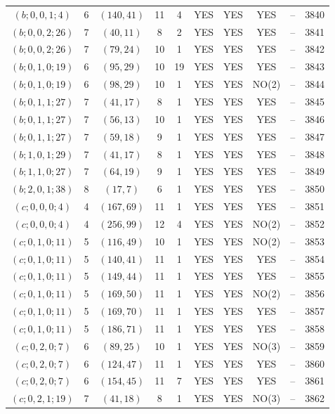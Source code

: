 \begin{longtable}{|c|c|c|c|c|c|c|c|c|c|}
$(b; 0, 0, 1; 4)$ & 6 & $(140, 41)$ & 11 & 4 & YES & YES & YES & -- & 3840\\
$(b; 0, 0, 2; 26)$ & 7 & $(40, 11)$ & 8 & 2 & YES & YES & YES & -- & 3841\\
$(b; 0, 0, 2; 26)$ & 7 & $(79, 24)$ & 10 & 1 & YES & YES & YES & -- & 3842\\
$(b; 0, 1, 0; 19)$ & 6 & $(95, 29)$ & 10 & 19 & YES & YES & YES & -- & 3843\\
$(b; 0, 1, 0; 19)$ & 6 & $(98, 29)$ & 10 & 1 & YES & YES & NO(2) & -- & 3844\\
$(b; 0, 1, 1; 27)$ & 7 & $(41, 17)$ & 8 & 1 & YES & YES & YES & -- & 3845\\
$(b; 0, 1, 1; 27)$ & 7 & $(56, 13)$ & 10 & 1 & YES & YES & YES & -- & 3846\\
$(b; 0, 1, 1; 27)$ & 7 & $(59, 18)$ & 9 & 1 & YES & YES & YES & -- & 3847\\
$(b; 1, 0, 1; 29)$ & 7 & $(41, 17)$ & 8 & 1 & YES & YES & YES & -- & 3848\\
$(b; 1, 1, 0; 27)$ & 7 & $(64, 19)$ & 9 & 1 & YES & YES & YES & -- & 3849\\
$(b; 2, 0, 1; 38)$ & 8 & $(17, 7)$ & 6 & 1 & YES & YES & YES & -- & 3850\\
$(c; 0, 0, 0; 4)$ & 4 & $(167, 69)$ & 11 & 1 & YES & YES & YES & -- & 3851\\
$(c; 0, 0, 0; 4)$ & 4 & $(256, 99)$ & 12 & 4 & YES & YES & NO(2) & -- & 3852\\
$(c; 0, 1, 0; 11)$ & 5 & $(116, 49)$ & 10 & 1 & YES & YES & NO(2) & -- & 3853\\
$(c; 0, 1, 0; 11)$ & 5 & $(140, 41)$ & 11 & 1 & YES & YES & YES & -- & 3854\\
$(c; 0, 1, 0; 11)$ & 5 & $(149, 44)$ & 11 & 1 & YES & YES & YES & -- & 3855\\
$(c; 0, 1, 0; 11)$ & 5 & $(169, 50)$ & 11 & 1 & YES & YES & NO(2) & -- & 3856\\
$(c; 0, 1, 0; 11)$ & 5 & $(169, 70)$ & 11 & 1 & YES & YES & YES & -- & 3857\\
$(c; 0, 1, 0; 11)$ & 5 & $(186, 71)$ & 11 & 1 & YES & YES & YES & -- & 3858\\
$(c; 0, 2, 0; 7)$ & 6 & $(89, 25)$ & 10 & 1 & YES & YES & NO(3) & -- & 3859\\
$(c; 0, 2, 0; 7)$ & 6 & $(124, 47)$ & 11 & 1 & YES & YES & YES & -- & 3860\\
$(c; 0, 2, 0; 7)$ & 6 & $(154, 45)$ & 11 & 7 & YES & YES & YES & -- & 3861\\
$(c; 0, 2, 1; 19)$ & 7 & $(41, 18)$ & 8 & 1 & YES & YES & NO(3) & -- & 3862\\

\end{longtable}
